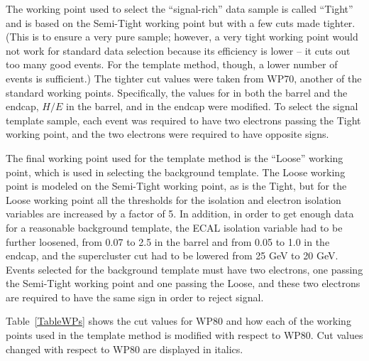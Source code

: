The working point used to select the ``signal-rich'' 
data sample is called ``Tight'' 
and is based on the Semi-Tight working point 
but with a few cuts made tighter.  
(This is to ensure a very pure sample; 
however, a very tight working point would not work 
for standard data selection because its 
efficiency is lower -- 
it cuts out too many good events.  
For the template method, though, a lower number 
of events is sufficient.)  
The tighter cut values were taken from WP70, 
another of the standard working points. %
Specifically, 
the values for 
\dphiin in both the barrel and the endcap, 
$H/E$ in the barrel, 
and \detain in the endcap 
were modified.  
To select the signal template sample, 
each event was required to have two electrons 
passing the Tight working point, 
and the two electrons were required to have 
opposite signs.  

The final working point used for the template method 
is the ``Loose'' working point, 
which is used in selecting the background template.  
The Loose working point is modeled on the 
Semi-Tight working point, as is the Tight, 
but for the Loose working point 
all the thresholds for the isolation 
and electron isolation variables 
are increased by a factor of 5.  
In addition, in order to get enough data 
for a reasonable background template, 
the ECAL isolation variable had to be further loosened, 
from 0.07 to 2.5 in the barrel and from 0.05 to 1.0 in the endcap, 
and the supercluster \Et cut had to be lowered 
from 25 GeV to 20 GeV.  
Events selected for the background template 
must have two electrons, 
one passing the Semi-Tight working point 
and one passing the Loose, 
and these two electrons are required to 
have the same sign in order to reject signal.  


Table~\ref{TableWPs} shows the cut values for 
WP80 and how each of the working points used 
in the template method is modified with 
respect to WP80.  
Cut values changed with respect to WP80 
are displayed in italics.  


